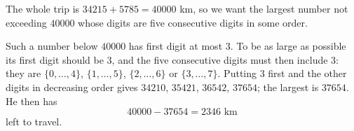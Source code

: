 The whole trip is $34215+5785=40000$ km, so we want the largest number not exceeding $40000$ whose digits are five consecutive digits in some order.

Such a number below $40000$ has first digit at most $3$. To be as large as possible its first digit should be $3$, and the five consecutive digits must then include $3$: they are $\{0,\dots,4\}$, $\{1,\dots,5\}$, $\{2,\dots,6\}$ or $\{3,\dots,7\}$. Putting $3$ first and the other digits in decreasing order gives $34210$, $35421$, $36542$, $37654$; the largest is $37654$. He then has
\[
40000-37654=\boxed{2346}\text{ km}
\]
left to travel.

